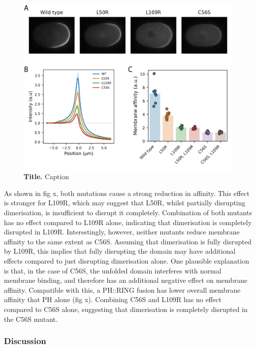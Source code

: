 \documentclass[12pt]{"article"}
\newcommand{\mycaption}[2]{\caption[#1]{\textbf{#1.} #2}}
\begin{document}
\begin{figure}[!h]
\includegraphics[scale=0.9]{dimer_interface_mutants_in_vivo}
\setlength{\abovecaptionskip}{20pt}
\centering
\mycaption{Title}{Caption}
\label{fig:dimer_interface_mutants_in_vivo}
\end{figure}

As shown in fig x, both mutations cause a strong reduction in affinity. This effect is stronger for L109R, which may suggest that L50R, whilst partially disrupting dimerisation, is insufficient to disrupt it completely. Combination of both mutants has no effect compared to L109R alone, indicating that dimerisation is completely disrupted in L109R. Interestingly, however, neither mutants reduce membrane affinity to the same extent as C56S. Assuming that dimerisation is fully disrupted by L109R, this implies that fully disrupting the domain may have additional effects compared to just disrupting dimerisation alone. One plausible explanation is that, in the case of C56S, the unfolded domain interferes with normal membrane binding, and therefore has an additional negative effect on membrane affinity. Compatible with this, a PH::RING fusion has lower overall membrane affinity that PH alone (fig x). Combining C56S and L109R has no effect compared to C56S alone, suggesting that dimerisation is completely disrupted in the C56S mutant.\\

\clearpage
\subsubsection{Discussion}
\end{document}
